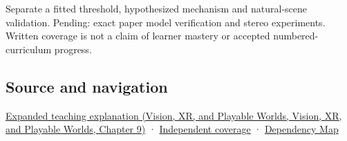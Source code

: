Separate a fitted threshold, hypothesized mechanism and natural-scene validation. Pending: exact paper model verification and stereo experiments. Written coverage is not a claim of learner mastery or accepted numbered-curriculum progress.

\subsection{Source and navigation}\label{appendix-8dc848f14052-source-and-navigation}

\href{../07-Vision-XR-and-Playable-Worlds/main.pdf\#nameddest=04-visual-computing-ii-ch042-binocular-depth-changes-the-optimization-question}{Expanded teaching explanation (Vision, XR, and Playable Worlds, Vision, XR, and Playable Worlds, Chapter 9)} · \hyperref[appendix-fd090d982a15-xr01---independent-seeing-and-representation-source]{Independent coverage} · \hyperref[appendix-4ad47bdd269a]{Dependency Map}
